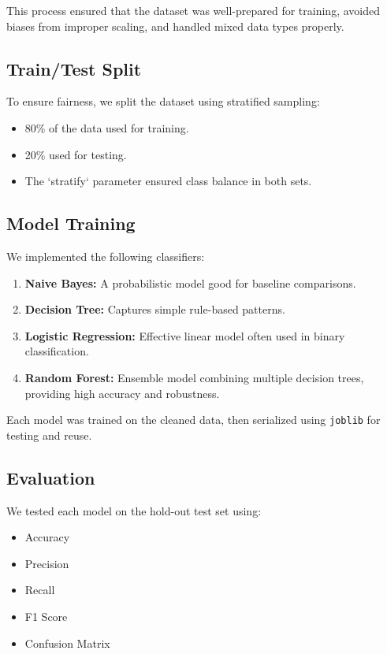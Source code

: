 \documentclass[conference]{IEEEtran}
\begin{document}
This process ensured that the dataset was well-prepared for training, avoided biases from improper scaling, and handled mixed data types properly.

\subsection{Train/Test Split}
To ensure fairness, we split the dataset using stratified sampling:
\begin{itemize}
    \item 80\% of the data used for training.
    \item 20\% used for testing.
    \item The `stratify` parameter ensured class balance in both sets.
\end{itemize}

\subsection{Model Training}
We implemented the following classifiers:
\begin{enumerate}
    \item \textbf{Naive Bayes:} A probabilistic model good for baseline comparisons.
    \item \textbf{Decision Tree:} Captures simple rule-based patterns.
    \item \textbf{Logistic Regression:} Effective linear model often used in binary classification.
    \item \textbf{Random Forest:} Ensemble model combining multiple decision trees, providing high accuracy and robustness.
\end{enumerate}

Each model was trained on the cleaned data, then serialized using \texttt{joblib} for testing and reuse.

\subsection{Evaluation}
We tested each model on the hold-out test set using:
\begin{itemize}
    \item Accuracy
    \item Precision
    \item Recall
    \item F1 Score
    \item Confusion Matrix
\end{itemize}
\end{document}
